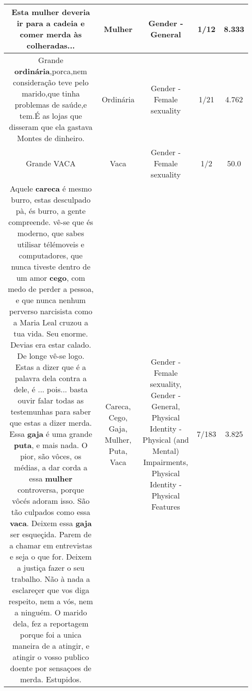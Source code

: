 \documentclass[11pt]{article}
\newlength\mylength
\begin{document}
\begin{center}
\begin{longtable}{|C{.65\mylength}|C{.30\mylength}|C{.12\mylength}|C{.12\mylength}|C{.12\mylength}|}
  \small Esta \textbf{mulher} deveria ir para a cadeia e comer merda às colheradas...\normalsize   & Mulher & Gender - General & 1/12 & 8.333 \\  \hline
  \small Grande \textbf{ordinária},porca,nem consideração  teve pelo marido,que tinha problemas de saúde,e tem.É as lojas que disseram que ela gastava Montes de dinheiro.\normalsize   & Ordinária & Gender - Female sexuality & 1/21 & 4.762 \\  \hline
  \small Grande VACA\normalsize   & Vaca & Gender - Female sexuality & 1/2 & 50.0 \\  \hline
  \small Aquele \textbf{careca} é mesmo burro, estas desculpado pà, és burro, a gente compreende.  vê-se que és moderno, que sabes utilisar télémoveis e computadores, que nunca tiveste dentro de um amor \textbf{cego}, com medo de perder a pessoa, e que nunca nenhum perverso narcisista como a Maria Leal cruzou a tua vida.  Seu enorme. Devias era estar calado. De longe vê-se logo. Estas a dizer que é a palavra dela contra a dele, é ... pois... basta ouvir falar todas as testemunhas para saber que estas a dizer merda. Essa \textbf{gaja} é uma grande \textbf{puta}, e mais nada.  O pior, são vôces, os médias,  a dar corda a essa \textbf{mulher} controversa, porque vôcés adoram isso.  São tão culpados como essa \textbf{vaca}. Deixem essa \textbf{gaja} ser esqueçida. Parem de a chamar em entrevistas e seja o que for.  Deixem a justiça fazer o seu trabalho.  Não à nada a esclareçer que vos diga respeito, nem a vós, nem a ninguém. O marido dela, fez a reportagem porque foi a unica maneira de a atingir, e atingir o vosso publico doente por sensaçoes de merda. Estupidos.\normalsize   & Careca, Cego, Gaja, Mulher, Puta, Vaca & Gender - Female sexuality, Gender - General, Physical Identity - Physical (and Mental) Impairments, Physical Identity - Physical Features & 7/183 & 3.825 \\  \hline

\end{longtable}
\end{center}
\end{document}
